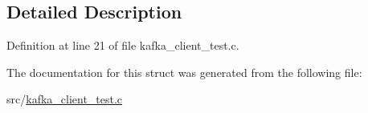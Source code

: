 \subsection{Detailed Description}


Definition at line 21 of file kafka\-\_\-client\-\_\-test.\-c.



The documentation for this struct was generated from the following file\-:\begin{DoxyCompactItemize}
\item 
src/\hyperlink{kafka__client__test_8c}{kafka\-\_\-client\-\_\-test.\-c}\end{DoxyCompactItemize}
